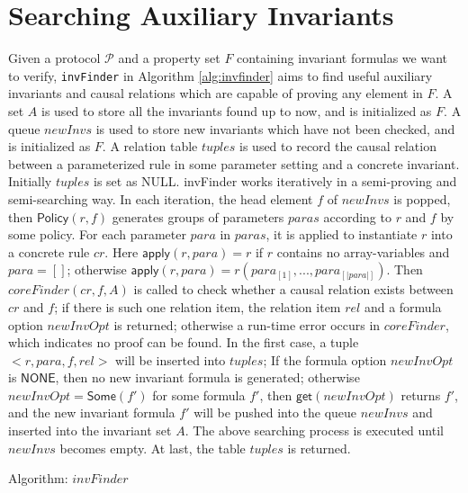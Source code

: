\documentclass[final]{IEEEtran}
\begin{document}
{\section{  Searching Auxiliary Invariants}\label{sec:invFinder}
Given a protocol $\mathcal{P}$ and a property set $F$ containing invariant formulas we want to verify, {\tt invFinder} in Algorithm \ref{alg:invfinder} aims to find useful auxiliary invariants and causal relations which are capable of proving any element in $F$.  A set $A$ is used to store all the invariants found up to now, and is initialized as  $F$. A queue  $newInvs$ is used to store new invariants which have not been checked,  and  is initialized as  $F$.  A relation table $tuples$ is used to record the causal relation between a parameterized rule in some parameter setting and a concrete invariant. Initially $tuples$ is set as NULL.
{\sf invFinder}  works iteratively in a semi-proving and semi-searching way. In each iteration, the head element $f$ of $newInvs$ is popped,  then $\mathsf{Policy}(r,f)$  generates groups of parameters $paras$  according to $r$ and $f$ by some policy. For each parameter $para$ in $paras$,   it is applied to instantiate $r$ into a concrete rule $cr$.  Here  $\mathsf{apply}(r,para)=r$ if $r$ contains no array-variables and $para=[]$; otherwise $\mathsf{apply}(r,para)=r(para_{[1]},..., para_{[|para|]})$. Then $coreFinder(cr,  f, A)$ is called to check
 whether  a causal relation exists between $cr$ and $f$; if there is such one relation item, the relation item $rel$ and a  formula option $newInvOpt$ is returned; otherwise a run-time error occurs in  $coreFinder$, which indicates no proof can be found. In the first case, a tuple $<r, para, f, rel>$ will be inserted into $tuples$; If the formula option $newInvOpt$ is $\mathsf{NONE}$, then no new invariant formula is generated; otherwise $newInvOpt=\mathsf{Some}(f')$ for some formula $f'$, then  $\mathsf{get}(newInvOpt)$ returns $f'$, and the new invariant formula $f'$ will be pushed into the queue $newInvs$ and inserted into the invariant set $A$.  The above searching process is executed until $newInvs$ becomes empty.  At last, the table $tuples$ is returned.

\SetAlFnt{\small}


\begin{algorithm}

\caption{Algorithm: $invFinder$\label{alg:invfinder}}



\end{algorithm}}
\end{document}
